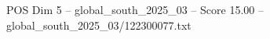 \begin{textsample}{POS Dim 5 – global\_south\_2025\_03 – Score 15.00 – global\_south\_2025\_03/122300077.txt}
\end{textsample}
